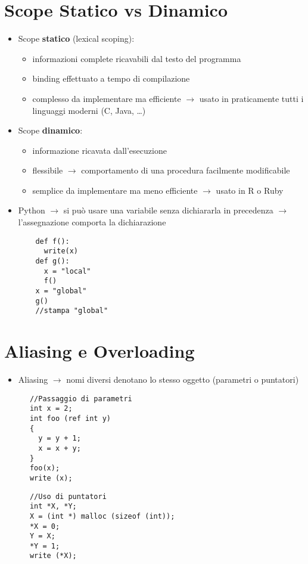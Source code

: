 \documentclass{article}
\begin{document}
\section*{Scope Statico vs Dinamico}
\begin{itemize}
  \item Scope \textbf{statico} (lexical scoping):
  \begin{itemize}
    \item informazioni complete ricavabili dal testo del programma
    \item binding effettuato a tempo di compilazione
    \item complesso da implementare ma efficiente $\rightarrow$ usato in praticamente tutti i linguaggi moderni (C, Java, \dots)
  \end{itemize}
  \item Scope \textbf{dinamico}:
  \begin{itemize}
    \item informazione ricavata dall'esecuzione
    \item flessibile $\rightarrow$ comportamento di una procedura facilmente modificabile
    \item semplice da implementare ma meno efficiente $\rightarrow$ usato in R o Ruby
  \end{itemize}
  \item Python $\rightarrow$ si può usare una variabile senza dichiararla in precedenza $\rightarrow$ l'assegnazione comporta la dichiarazione
  \begin{lstlisting}
    def f():
      write(x)
    def g():
      x = "local"
      f()
    x = "global"
    g()
    //stampa "global"
  \end{lstlisting}
\end{itemize}

\section*{Aliasing e Overloading}
\begin{itemize}
  \item Aliasing $\rightarrow$ nomi diversi denotano lo stesso oggetto (parametri o puntatori)
\end{itemize}

  \begin{multicols}{2}
    \begin{lstlisting}
      //Passaggio di parametri
      int x = 2;
      int foo (ref int y)
      {
        y = y + 1;
        x = x + y;
      }
      foo(x);
      write (x);
    \end{lstlisting}
    \columnbreak 
    \begin{lstlisting}
      //Uso di puntatori
      int *X, *Y;
      X = (int *) malloc (sizeof (int));
      *X = 0;
      Y = X;
      *Y = 1;
      write (*X);
    \end{lstlisting}
  \end{multicols}
\end{document}
